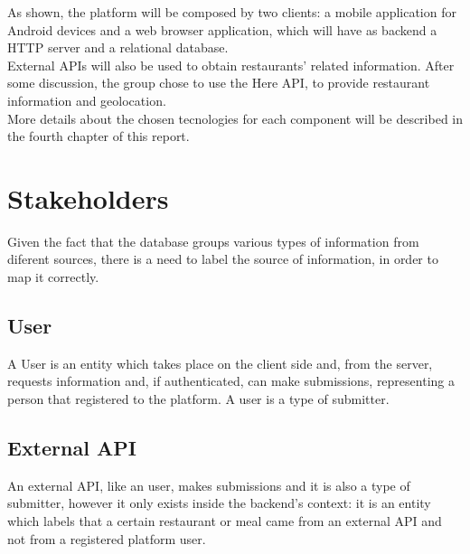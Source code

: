 As shown, the platform will be composed by two clients: a mobile application for Android devices and a web browser
application, which will have as backend a HTTP server and a relational database.\\

External APIs will also be used to obtain restaurants' related information. After some discussion, the group chose
to use the Here API, to provide restaurant information and geolocation.\\

More details about the chosen tecnologies for each component will be described in the fourth chapter of this report.\\

\section{Stakeholders}

Given the fact that the database groups various types of information from diferent sources,
there is a need to label the source of information, in order to map it correctly.\\

\subsection{User}

A User is an entity which takes place on the client side and, from the server, requests information and, if authenticated, can make submissions,
representing a person that registered to the platform. A user is a type of submitter.\\

\subsection{External API}

An external API, like an user, makes submissions and it is also a type of submitter, however it only exists inside the backend's context: 
it is an entity which labels that a certain restaurant or meal came from an 
external API and not from a registered platform user.\\